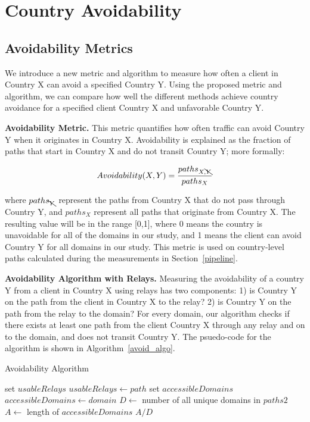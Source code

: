 \section{Country Avoidability}
\label{avoid_results}

\subsection{Avoidability Metrics}
\label{metrics}
We introduce a new metric and algorithm to measure how often a client in Country X can avoid a specified Country Y.  Using the proposed metric and algorithm, we can compare how well the different methods achieve country avoidance for a specified client Country X and unfavorable Country Y.

{\bf Avoidability Metric.}  This metric quantifies how often traffic can avoid Country Y when it originates in Country X.  Avoidability is explained as the fraction of paths that start in Country X and do not transit Country Y; more formally:

\[Avoidability(X,Y) = \frac{paths_{X,\bcancel{Y}}}{paths_{X}}\]

where $paths_{\bcancel{Y}}$ represent the paths from Country X that do not pass through Country Y, and $paths_{X}$ represent all paths that originate from Country X. The resulting value will be in the range [0,1], where 0 means the country is unavoidable for all of the domains in our study, and 1 means the client can avoid Country Y for all domains in our study.  This metric is used on country-level paths calculated during the measurements in Section~\ref{pipeline}.

{\bf Avoidability Algorithm with Relays.}  Measuring the avoidability of a country Y from a client in Country X using relays has two components: 1) is Country Y on the path from the client in Country X to the relay?  2) is Country Y on the path from the relay to the domain?  For every domain, our algorithm checks if there exists at least one path from the client Country X through any relay and on to the domain, and does not transit Country Y.  The psuedo-code for the algorithm is shown in Algorithm~\ref{avoid_algo}.

\begin{algorithm}
\caption{Avoidability Algorithm}
\label{avoid_algo}
\begin{algorithmic}[1]
    \State set $usableRelays$
		\State $usableRelays \gets path$
	\EndIf
    \EndFor
    \State set $accessibleDomains$
        \State $accessibleDomains \gets domain$
        \EndIf
    \EndIf
    \EndFor
    \State $D \gets$ number of all unique domains in $paths2$
    \State $A \gets$ length of $accessibleDomains$
    \State \Return $A / D$
\EndFunction
\end{algorithmic}
\end{algorithm}

